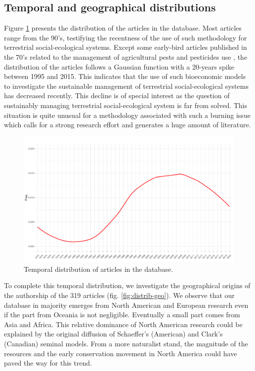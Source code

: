 \subsection{Temporal and geographical distributions}

Figure \ref{fig:distrib} presents the distribution of the articles in the database. Most articles range from the 90's, testifying the recentness of the use of such methodology for terrestrial social-ecological systems.  
Except some early-bird articles published in the 70's related to the management of agricultural pests and pesticides use \citep{Hueth1974,Feder1975}, the distribution of the articles follows a Gaussian function with a 20-years spike between 1995 and 2015. This indicates that the use of such bioeconomic models to investigate the sustainable management of terrestrial social-ecological systems has decreased recently. This  decline is of special interest  as  the question of sustainably managing terrestrial social-ecological system is far from solved. This situation is quite unusual for a methodology associated with such a burning issue which calls for a strong research effort and generates a huge amount of literature.

\begin{figure}
\includegraphics[width=.8\textwidth]{figures/review/temporal_distribution_full.pdf}
\caption{\label{fig:distrib} Temporal distribution of articles in the database.}
\end{figure}

To complete this temporal distribution, we investigate the geographical origins of the authorship of the 319 articles (fig. \ref{fig:distrib-geo}). 
We observe that our database in majority emerges from North American and European research even if the part from Oceania is not negligible. Eventually a small part comes from Asia and Africa. This relative dominance of North American research could be explained by the original diffusion of Schaeffer's (American) and Clark's (Canadian) seminal models. From a more naturalist stand, the magnitude of the resources and the early conservation movement in North America could have paved the way for this trend.

